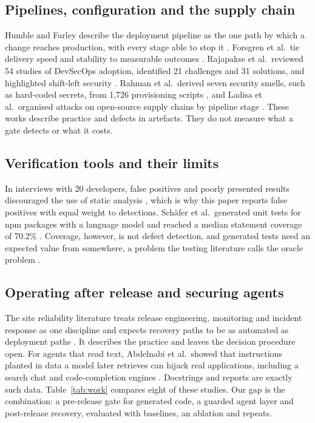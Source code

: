 \documentclass[12pt,onecolumn,draftclsnofoot]{IEEEtran}
\begin{document}
\subsection{Pipelines, configuration and the supply chain}
Humble and Farley describe the deployment pipeline as the one path by which a change reaches production, with every stage able to stop it \cite{humble2010}. Forsgren et al.\ tie delivery speed and stability to measurable outcomes \cite{forsgren2018}. Rajapakse et al.\ reviewed 54 studies of DevSecOps adoption, identified 21 challenges and 31 solutions, and highlighted shift-left security \cite{rajapakse2022}. Rahman et al.\ derived seven security smells, such as hard-coded secrets, from 1,726 provisioning scripts \cite{rahman2019sins}, and Ladisa et al.\ organised attacks on open-source supply chains by pipeline stage \cite{ladisa2023}. These works describe practice and defects in artefacts. They do not measure what a gate detects or what it costs.

\subsection{Verification tools and their limits}
In interviews with 20 developers, false positives and poorly presented results discouraged the use of static analysis \cite{johnson2013}, which is why this paper reports false positives with equal weight to detections. Sch{\"a}fer et al.\ generated unit tests for npm packages with a language model and reached a median statement coverage of 70.2\% \cite{schafer2024}. Coverage, however, is not defect detection, and generated tests need an expected value from somewhere, a problem the testing literature calls the oracle problem \cite{barr2015}.

\subsection{Operating after release and securing agents}
The site reliability literature treats release engineering, monitoring and incident response as one discipline and expects recovery paths to be as automated as deployment paths \cite{beyer2016}. It describes the practice and leaves the decision procedure open. For agents that read text, Abdelnabi et al.\ showed that instructions planted in data a model later retrieves can hijack real applications, including a search chat and code-completion engines \cite{abdelnabi2023}. Docstrings and reports are exactly such data. Table~\ref{tab:work} compares eight of these studies. Our gap is the combination: a pre-release gate for generated code, a guarded agent layer and post-release recovery, evaluated with baselines, an ablation and repeats.
\end{document}
